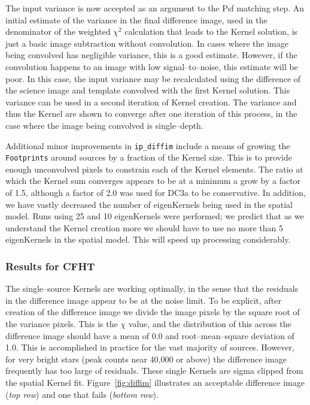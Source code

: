 The input variance is now accepted as an argument to the Psf matching
step.  An initial estimate of the variance in the final difference
image, used in the denominator of the weighted $\chi^2$ calculation
that leads to the Kernel solution, is just a basic image subtraction
without convolution.  In cases where the image being convolved has
negligible variance, this is a good estimate.  However, if the
convolution happens to an image with low signal--to--noise, this
estimate will be poor.  In this case, the input variance may be
recalculated using the difference of the science image and template
convolved with the first Kernel solution.  This variance can be used
in a second iteration of Kernel creation.  The variance and thus the
Kernel are shown to converge after one iteration of this process, in
the case where the image being convolved is single--depth.

Additional minor improvements in {\tt ip\_diffim} include a means of
growing the {\tt Footprints} around sources by a fraction of the
Kernel size.  This is to provide enough unconvolved pixels to
constrain each of the Kernel elements.  The ratio at which the Kernel
sum converges appears to be at a minimum a grow by a factor of 1.5,
although a factor of 2.0 was used for DC3a to be conservative.  In
addition, we have vastly decreased the number of eigenKernels being
used in the spatial model.  Runs using 25 and 10 eigenKernels were
performed; we predict that as we understand the Kernel creation more
we should have to use no more than 5 eigenKernels in the spatial
model.  This will speed up processing considerably.

\subsubsection{Results for CFHT}

The single--source Kernels are working optimally, in the sense that
the residuals in the difference image appear to be at the noise limit.
To be explicit, after creation of the difference image we divide the
image pixels by the square root of the variance pixels.  This is the
$\chi$ value, and the distribution of this across the difference image
should have a mean of 0.0 and root--mean--square deviation of 1.0.
This is accomplished in practice for the vast majority of sources.
However, for very bright stars (peak counts near 40,000 or above) the
difference image frequently has too large of residuals.  These single
Kernels are sigma clipped from the spatial Kernel fit.
Figure~\ref{fig:diffim} illustrates an acceptable difference image
({\it top row}) and one that fails ({\it bottom row}).  

